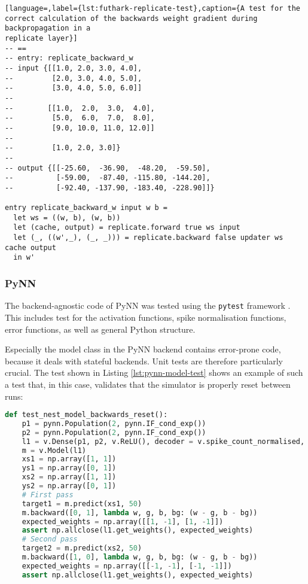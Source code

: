 \begin{minipage}{\linewidth}
\begin{lstlisting}[language=,label={lst:futhark-replicate-test},caption={A test for the
correct calculation of the backwards weight gradient during backpropagation in a
replicate layer}]
-- ==
-- entry: replicate_backward_w
-- input {[[1.0, 2.0, 3.0, 4.0],
--         [2.0, 3.0, 4.0, 5.0],
--         [3.0, 4.0, 5.0, 6.0]]
--
--        [[1.0,  2.0,  3.0,  4.0],
--         [5.0,  6.0,  7.0,  8.0],
--         [9.0, 10.0, 11.0, 12.0]]
--
--         [1.0, 2.0, 3.0]}
--
-- output {[[-25.60,  -36.90,  -48.20,  -59.50],
--          [-59.00,  -87.40, -115.80, -144.20],
--          [-92.40, -137.90, -183.40, -228.90]]}

entry replicate_backward_w input w b =
  let ws = ((w, b), (w, b))
  let (cache, output) = replicate.forward true ws input
  let (_, ((w',_), (_, _))) = replicate.backward false updater ws cache output
  in w'
\end{lstlisting}
\end{minipage}

\subsubsection{PyNN}
The backend-agnostic code of PyNN was tested using the \texttt{pytest} framework
\cite{pytest2018}.
This includes test for the activation functions, spike normalisation functions, error functions, 
as well as general Python structure.

Especially the model class in the PyNN backend contains error-prone code, because it
deals with stateful backends.
Unit tests are therefore particularly crucial.
The test shown in Listing \ref{lst:pynn-model-test} shows an example of such a
test that, in this case, validates that the simulator is properly reset between runs:

\begin{lstlisting}[language=Python,label={lst:pynn-model-test},caption={Unit test for
PyNN model to validate that the model correctly updates weights}]
def test_nest_model_backwards_reset():
    p1 = pynn.Population(2, pynn.IF_cond_exp())
    p2 = pynn.Population(2, pynn.IF_cond_exp())
    l1 = v.Dense(p1, p2, v.ReLU(), decoder = v.spike_count_normalised, weights = 1)
    m = v.Model(l1)
    xs1 = np.array([1, 1])
    ys1 = np.array([0, 1])
    xs2 = np.array([1, 1])
    ys2 = np.array([0, 1])
    # First pass
    target1 = m.predict(xs1, 50)
    m.backward([0, 1], lambda w, g, b, bg: (w - g, b - bg))
    expected_weights = np.array([[1, -1], [1, -1]])
    assert np.allclose(l1.get_weights(), expected_weights)
    # Second pass
    target2 = m.predict(xs2, 50)
    m.backward([1, 0], lambda w, g, b, bg: (w - g, b - bg))
    expected_weights = np.array([[-1, -1], [-1, -1]])
    assert np.allclose(l1.get_weights(), expected_weights)
\end{lstlisting}

